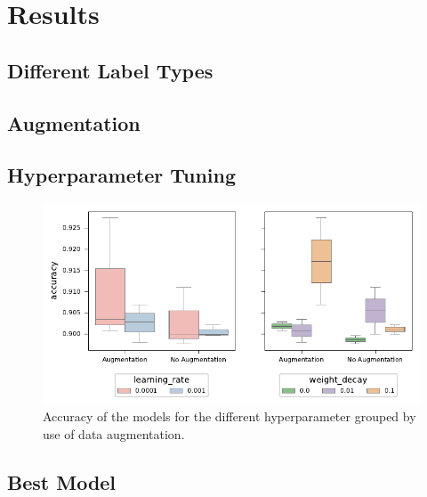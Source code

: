 


\section{Results}
\label{results}

\subsection{Different Label Types}%


\subsection{Augmentation}%


\subsection{Hyperparameter Tuning}%

\begin{figure}[H]
    \centering
    \captionsetup{width=0.8\linewidth}
    \includegraphics{figures/hp_tuning_boxplot.pdf}
    \caption{Accuracy of the models for the different hyperparameter grouped by use of data augmentation.}
    \label{fig:hp_tuning_boxplot}
\end{figure}



\subsection{Best Model}%

